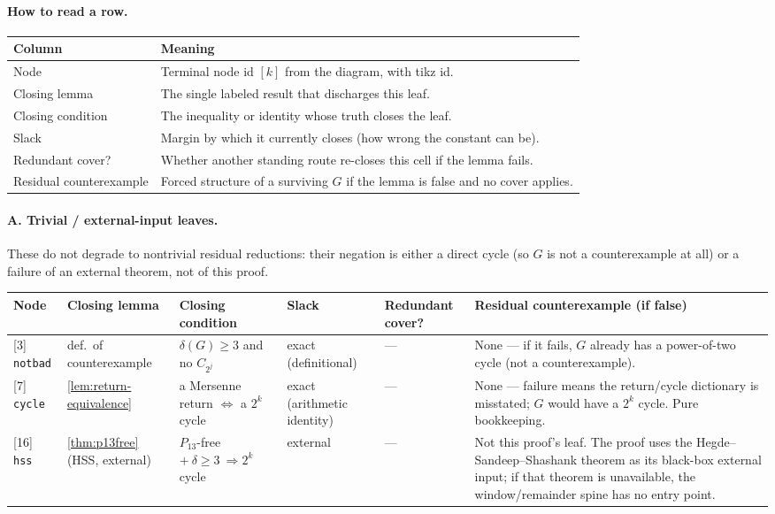 \documentclass[11pt]{article}
\begin{document}
\paragraph{How to read a row.}
{\small
\begin{longtable}{L{0.22\textwidth} L{0.70\textwidth}}
\toprule
\textbf{Column} & \textbf{Meaning} \\
\midrule
\endhead
Node & Terminal node id $[k]$ from the diagram, with tikz id. \\
Closing lemma & The single labeled result that discharges this leaf. \\
Closing condition & The inequality or identity whose truth closes the leaf. \\
Slack & Margin by which it currently closes (how wrong the constant can be). \\
Redundant cover? & Whether another standing route re-closes this cell if the lemma fails. \\
Residual counterexample & Forced structure of a surviving $G$ if the lemma is false and no cover applies. \\
\bottomrule
\end{longtable}
}

\paragraph{A. Trivial / external-input leaves.}
These do not degrade to nontrivial residual reductions: their negation is either a direct cycle (so $G$ is not a counterexample at all) or a failure of an external theorem, not of this proof.

{\scriptsize\setlength{\tabcolsep}{3pt}
\begin{longtable}{L{0.09\textwidth} L{0.095\textwidth} L{0.15\textwidth} L{0.08\textwidth} L{0.105\textwidth} L{0.335\textwidth}}
\toprule
\textbf{Node} & \textbf{Closing lemma} & \textbf{Closing condition} & \textbf{Slack} & \textbf{Redundant cover?} & \textbf{Residual counterexample (if false)} \\
\midrule
\endhead
{[3]} \texttt{notbad} & def.\ of counterexample & $\delta(G)\ge3$ and no $C_{2^j}$ & exact (definitional) & --- & None --- if it fails, $G$ already has a power-of-two cycle (not a counterexample). \\
{[7]} \texttt{cycle} & \cref{lem:return-equivalence} & a Mersenne return $\iff$ a $2^k$ cycle & exact (arithmetic identity) & --- & None --- failure means the return/cycle dictionary is misstated; $G$ would have a $2^k$ cycle. Pure bookkeeping. \\
{[16]} \texttt{hss} & \cref{thm:p13free} (HSS, external) & $P_{13}$-free $+\ \delta\ge3\ \Rightarrow 2^k$ cycle & external & --- & Not this proof's leaf. The proof uses the Hegde--Sandeep--Shashank theorem as its black-box external input; if that theorem is unavailable, the window/remainder spine has no entry point. \\
\bottomrule
\end{longtable}
}
\end{document}
